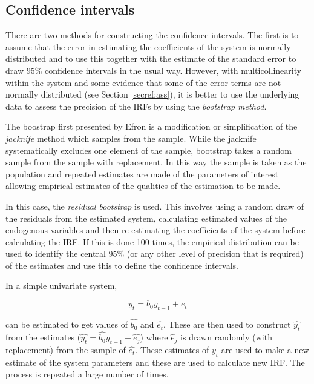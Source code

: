 \documentclass[12pt, a4paper, oneside]{article}\usepackage[]{graphicx}\usepackage[]{color}
\begin{document}
\subsection{Confidence intervals}
There are two methods for constructing the confidence intervals.  The first is to assume that the error in estimating the coefficients of the system is normally distributed and to use this together with the estimate of the standard error to draw 95\% confidence intervals in the usual way.  However, with multicollinearity within the system and some evidence that some of the error terms are not normally distributed (see Section \ref{secref:ass}), it is better to use the underlying data to assess the precision of the IRFs by using the \emph{bootstrap method}.  

The boostrap first presented by Efron \citep{Efron} is a modification or simplification of the \emph{jacknife} method which samples from the sample.  While the jacknife systematically excludes one element of the sample, bootstrap takes a random sample from the sample with replacement.  In this way the sample is taken as the population and repeated estimates are made of the parameters of interest allowing empirical estimates of the qualities of the estimation to be made.  

In this case, the \emph{residual bootstrap} is used.  This involves using a random draw of the residuals from the estimated system, calculating estimated values of the endogenous variables and then re-estimating the coefficients of the system before calculating the IRF.   If this is done 100 times, the empirical distribution can be used to identify the central 95\% (or any other level of precision that is required) of the estimates and use this to define the confidence intervals.  

In a simple univariate system, 

\begin{equation}
y_t = b_0 y_{t-1} + e_t
\end{equation} 

can be estimated to get values of  $\hat{b_0}$ and $\hat{e_t}$.  These are then used to construct $\hat{y_t}$ from the estimates ($\hat{y_t} = \hat{b_0}y_{t-1} + \hat{e_j}$) where $\hat{e_j}$ is drawn randomly (with replacement) from the sample of $\hat{e_t}$.   These estimates of $y_t$ are used to make a new estimate of the system parameters and these are used to calculate new IRF.  The process is repeated a large number of times.  
\end{document}
